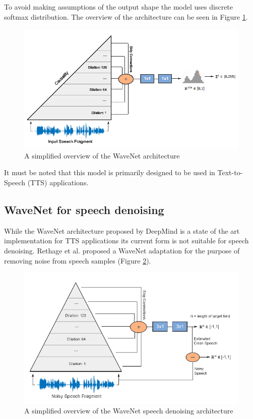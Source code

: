 \documentclass{article}
\begin{document}
	To avoid making assumptions of the output shape the model uses discrete softmax distribution. The overview of the architecture can be seen in Figure \ref{fig:wavenet}.

	\begin{figure}[H]
		\centering
		\includegraphics[width=.8\linewidth]{wavenet_overview.png}
		\caption{A simplified overview of the WaveNet architecture}
		\label{fig:wavenet}
	\end{figure}
	It must be noted that this model is primarily designed to be used in Text-to-Speech (TTS) applications.
	
	
	
	\subsection{WaveNet for speech denoising}
	While the WaveNet architecture proposed by DeepMind is a state of the art implementation for TTS applications its current form is not suitable for speech denoising.
	Rethage et al. \cite{rethage2018wavenet} proposed a WaveNet adaptation for the purpose of removing noise from speech samples (Figure \ref{fig:wavenet2}).
	
	\begin{figure}[H]
		\centering
		\includegraphics[width=.8\linewidth]{wavenet_overview2.png}
		\caption{A simplified overview of the WaveNet speech denoising architecture}
		\label{fig:wavenet2}
	\end{figure}
	
\end{document}
